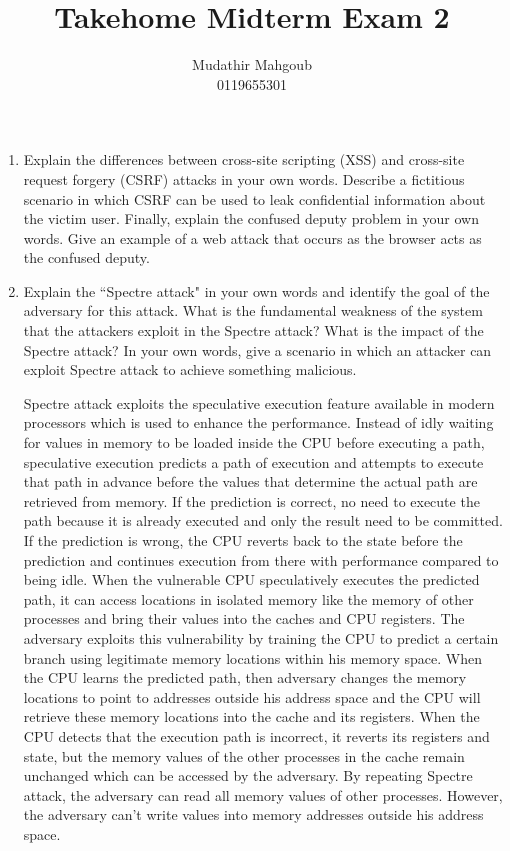\documentclass[12pt,a4paper]{article}
\author{Mudathir Mahgoub \\ 0119655301}
\title{Takehome Midterm Exam 2}
\begin{document}
\maketitle


\begin{enumerate}

\item Explain the differences between cross-site scripting (XSS) and cross-site
request forgery (CSRF) attacks in your own words. Describe a fictitious scenario in
which CSRF can be used to leak confidential information about the victim user. Finally,
explain the confused deputy problem in your own words. Give an example of a web
attack that occurs as the browser acts as the confused deputy.

\color{blue}

\color{black}

\item Explain the ``Spectre attack" in your own words and identify the goal of
the adversary for this attack. What is the fundamental weakness of the system that
the attackers exploit in the Spectre attack? What is the impact of the Spectre attack?
In your own words, give a scenario in which an attacker can exploit Spectre attack to
achieve something malicious.


\color{blue}
Spectre attack exploits the speculative execution feature available in modern processors which is used to enhance the performance. Instead of idly waiting for values in memory to be loaded inside the CPU before executing a path, speculative execution predicts a path of execution and attempts to execute that path in advance before the values that determine the actual path are retrieved from memory. If the prediction is correct, no need to execute the path  because it is already executed and only the result need to be committed. If the prediction is wrong, the CPU reverts back to the state before the prediction and continues execution from there with performance compared to being idle. When the vulnerable CPU speculatively executes the predicted path, it can access locations in isolated memory like the memory of other processes and bring their values into the caches and CPU registers. The adversary exploits this vulnerability by training the CPU to predict a certain branch using legitimate memory locations within his memory space. When the CPU learns the predicted path, then adversary changes the memory locations to point to addresses outside his address space and the CPU will retrieve these memory locations into the cache and its registers. When the CPU detects that the execution path is incorrect, it reverts its registers and state, but the memory values of the other processes in the cache remain unchanged which can be accessed by the adversary. By repeating Spectre attack, the adversary can read all memory values of other processes. However, the adversary can't write values into memory addresses outside his address space.


\end{enumerate}
\end{document}
